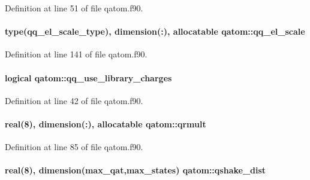Definition at line 51 of file qatom.\-f90.

\hypertarget{classqatom_a40ab497921d3e628b1881dca1bb118ad}{
\paragraph[{qq\-\_\-el\-\_\-scale}]{\setlength{\rightskip}{0pt plus 5cm}type({\bf qq\-\_\-el\-\_\-scale\-\_\-type}), dimension(\-:), allocatable qatom\-::qq\-\_\-el\-\_\-scale}}\label{classqatom_a40ab497921d3e628b1881dca1bb118ad}


Definition at line 141 of file qatom.\-f90.

\hypertarget{classqatom_af0b20b09ab7e5b34ab609d49ebccba3a}{
\paragraph[{qq\-\_\-use\-\_\-library\-\_\-charges}]{\setlength{\rightskip}{0pt plus 5cm}logical qatom\-::qq\-\_\-use\-\_\-library\-\_\-charges}}\label{classqatom_af0b20b09ab7e5b34ab609d49ebccba3a}


Definition at line 42 of file qatom.\-f90.

\hypertarget{classqatom_a75748cbd598a3a40c2fa8589e3306cc2}{
\paragraph[{qrmult}]{\setlength{\rightskip}{0pt plus 5cm}real(8), dimension(\-:), allocatable qatom\-::qrmult}}\label{classqatom_a75748cbd598a3a40c2fa8589e3306cc2}


Definition at line 85 of file qatom.\-f90.

\hypertarget{classqatom_aa4f7d5fe66a06eedb3c584c3c4d0d43c}{
\paragraph[{qshake\-\_\-dist}]{\setlength{\rightskip}{0pt plus 5cm}real(8), dimension({\bf max\-\_\-qat},{\bf max\-\_\-states}) qatom\-::qshake\-\_\-dist}}\label{classqatom_aa4f7d5fe66a06eedb3c584c3c4d0d43c}


